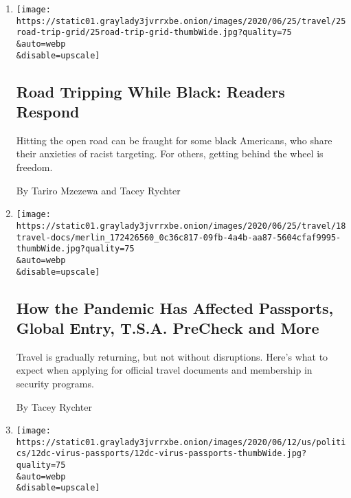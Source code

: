 \begin{enumerate}
\def\labelenumi{\arabic{enumi}.}
\item
  \href{/2020/06/25/travel/road-tripping-while-black-readers-respond.html}{}

  \texttt{[image: https://static01.graylady3jvrrxbe.onion/images/2020/06/25/travel/25road-trip-grid/25road-trip-grid-thumbWide.jpg?quality=75\\\&auto=webp\\\&disable=upscale]}

  \hypertarget{road-tripping-while-black-readers-respond}{%
  \subsection{Road Tripping While Black: Readers
  Respond}\label{road-tripping-while-black-readers-respond}}

  Hitting the open road can be fraught for some black Americans, who
  share their anxieties of racist targeting. For others, getting behind
  the wheel is freedom.

  By Tariro Mzezewa and Tacey Rychter
\item
  \href{/2020/06/20/travel/travel-documents-covid.html}{}

  \texttt{[image: https://static01.graylady3jvrrxbe.onion/images/2020/06/25/travel/18travel-docs/merlin\_172426560\_0c36c817-09fb-4a4b-aa87-5604cfaf9995-thumbWide.jpg?quality=75\\\&auto=webp\\\&disable=upscale]}

  \hypertarget{how-the-pandemic-has-affected-passports-global-entry-tsa-precheck-and-more}{%
  \subsection{How the Pandemic Has Affected Passports, Global Entry,
  T.S.A. PreCheck and
  More}\label{how-the-pandemic-has-affected-passports-global-entry-tsa-precheck-and-more}}

  Travel is gradually returning, but not without disruptions. Here's
  what to expect when applying for official travel documents and
  membership in security programs.

  By Tacey Rychter
\item
  \href{/2020/06/12/us/politics/coronavirus-passport-delays.html}{}

  \texttt{[image: https://static01.graylady3jvrrxbe.onion/images/2020/06/12/us/politics/12dc-virus-passports/12dc-virus-passports-thumbWide.jpg?quality=75\\\&auto=webp\\\&disable=upscale]}

  \hypertarget{virus-delays-passports-for-17-million-americans}{%
}
\end{enumerate}
